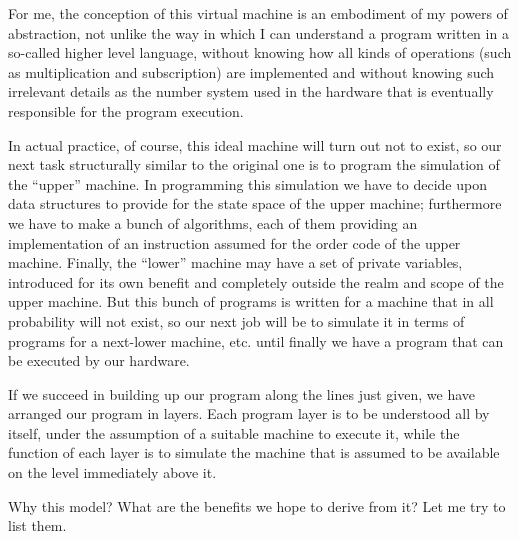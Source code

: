 For me, the conception of this virtual machine is an embodiment of my powers of abstraction, not unlike the way in which I can understand a program written in a so-called higher level language, without knowing how all kinds of operations (such as multiplication and subscription) are implemented and without knowing such irrelevant details as the number system used in the hardware that is eventually responsible for the program execution.

In actual practice, of course, this ideal machine will turn out not to exist, so our next task \textemdash{}  structurally similar to the original one \textemdash{}  is to program the simulation of the ``upper'' machine. In programming this simulation we have to decide upon data structures to provide for the state space of the upper machine; furthermore we have to make a bunch of algorithms, each of them providing an implementation of an instruction assumed for the order code of the upper machine. Finally, the ``lower'' machine may have a set of private variables, introduced for its own benefit and completely outside the realm and scope of the upper machine. But this bunch of programs is written for a machine that in all probability will not exist, so our next job will be to simulate it in terms of programs for a next-lower machine, etc. until finally we have a program that can be executed by our hardware.

If we succeed in building up our program along the lines just given, we have arranged our program in layers. Each program layer is to be understood all by itself, under the assumption of a suitable machine to execute it, while the function of each layer is to simulate the machine that is assumed to be available on the level immediately above it.

Why this model? What are the benefits we hope to derive from it? Let me try to list them.

